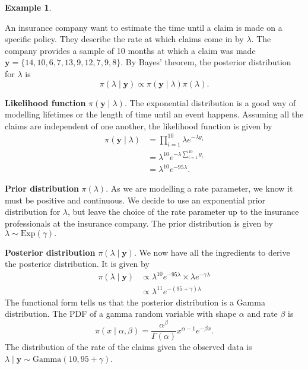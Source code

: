 \documentclass[
]{book}
\theoremstyle{definition}
\theoremstyle{definition}
\newtheorem{example}{Example}[chapter]
\theoremstyle{definition}
\theoremstyle{definition}
\theoremstyle{remark}
\begin{document}
\begin{example}
\protect\hypertarget{exm:exponential}{}\label{exm:exponential}

An insurance company want to estimate the time until a claim is made on a specific policy. They describe the rate at which claims come in by \(\lambda\). The company provides a sample of 10 months at which a claim was made \(\boldsymbol{y} = \{14, 10, 6, 7, 13, 9, 12, 7, 9, 8\}\). By Bayes' theorem, the posterior distribution for \(\lambda\) is
\[
\pi(\lambda \mid \boldsymbol{y}) \propto \pi(\boldsymbol{y} \mid \lambda) \pi(\lambda).
\]

\textbf{Likelihood function} \(\pi(\boldsymbol{y} \mid \lambda)\). The exponential distribution is a good way of modelling lifetimes or the length of time until an event happens. Assuming all the claims are independent of one another, the likelihood function is given by
\begin{align*}
\pi(\boldsymbol{y} \mid \lambda) &= \prod_{i=1}^{10} \lambda e^{-\lambda y_i} \\
& = \lambda^{10}e^{-\lambda \sum_{i=1}^{10} y_i} \\
& = \lambda^{10} e^{-95\lambda}.
\end{align*}

\textbf{Prior distribution} \(\pi(\lambda)\). As we are modelling a rate parameter, we know it must be positive and continuous. We decide to use an exponential prior distribution for \(\lambda\), but leave the choice of the rate parameter up to the insurance professionals at the insurance company. The prior distribution is given by \(\lambda \sim \textrm{Exp}(\gamma).\)

\textbf{Posterior distribution} \(\pi(\lambda \mid \boldsymbol{y})\). We now have all the ingredients to derive the posterior distribution. It is given by
\begin{align*}
\pi(\lambda \mid \boldsymbol{y}) &\propto \lambda^{10} e^{-95\lambda} \times \lambda e^{-\gamma\lambda} \\
& \propto \lambda^{11}e^{-(95 + \gamma)\lambda}
\end{align*}
The functional form tells us that the posterior distribution is a Gamma distribution. The PDF of a gamma random variable with shape \(\alpha\) and rate \(\beta\) is
\[
\pi(x \mid \alpha, \beta) = \frac{\alpha^\beta}{\Gamma(\alpha)}x^{\alpha-1}e^{-\beta x}.
\]
The distribution of the rate of the claims given the observed data is \(\lambda \mid \boldsymbol{y} \sim \textrm{Gamma}(10, 95 + \gamma)\).


\end{example}
\end{document}
